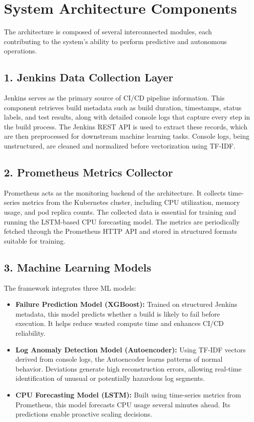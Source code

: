 \documentclass[12pt]{report}
\begin{document}
\section{System Architecture Components}

The architecture is composed of several interconnected modules, each contributing to the system's ability to perform predictive and autonomous operations.

\subsection*{1. Jenkins Data Collection Layer}
Jenkins serves as the primary source of CI/CD pipeline information. This component retrieves build metadata such as build duration, timestamps, status labels, and test results, along with detailed console logs that capture every step in the build process. The Jenkins REST API is used to extract these records, which are then preprocessed for downstream machine learning tasks. Console logs, being unstructured, are cleaned and normalized before vectorization using TF-IDF.

\subsection*{2. Prometheus Metrics Collector}
Prometheus acts as the monitoring backend of the architecture. It collects time-series metrics from the Kubernetes cluster, including CPU utilization, memory usage, and pod replica counts. The collected data is essential for training and running the LSTM-based CPU forecasting model. The metrics are periodically fetched through the Prometheus HTTP API and stored in structured formats suitable for training.

\subsection*{3. Machine Learning Models}
The framework integrates three ML models:

\begin{itemize}
    \item \textbf{Failure Prediction Model (XGBoost):} Trained on structured Jenkins metadata, this model predicts whether a build is likely to fail before execution. It helps reduce wasted compute time and enhances CI/CD reliability.
    \item \textbf{Log Anomaly Detection Model (Autoencoder):} Using TF-IDF vectors derived from console logs, the Autoencoder learns patterns of normal behavior. Deviations generate high reconstruction errors, allowing real-time identification of unusual or potentially hazardous log segments.
    \item \textbf{CPU Forecasting Model (LSTM):} Built using time-series metrics from Prometheus, this model forecasts CPU usage several minutes ahead. Its predictions enable proactive scaling decisions.
\end{itemize}
\end{document}
